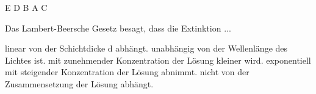 \documentclass[11pt]{exam}
\begin{document}
\begin{questions}
\begin{choices}
	\choice E
	\choice D
	\choice B
	\choice A
	\choice C
\end{choices}

\vspace{3mm}\question Das Lambert-Beersche Gesetz besagt, dass die Extinktion ...

\begin{choices}
	\choice linear von der Schichtdicke d abhängt.
	\choice unabhängig von der Wellenlänge des Lichtes ist.
	\choice mit zunehmender Konzentration der Lösung kleiner wird.
	\choice exponentiell mit steigender Konzentration der Lösung abnimmt.
	\choice nicht von der Zusammensetzung der Lösung abhängt.
\end{choices}

\vspace{3mm}\end{questions}
\end{document}
